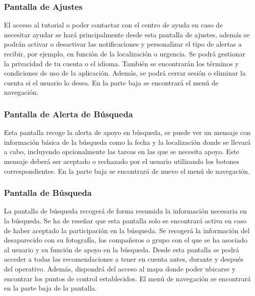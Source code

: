 
    \subsubsection{Pantalla de Ajustes}

    El acceso al tutorial o poder contactar con el centro de ayuda en caso de necesitar ayudar se hará principalmente desde esta pantalla de ajustes, además se podrán activar o desactivar las notificaciones y personalizar el tipo de alertas a recibir, por ejemplo, en función de la localización o urgencia. Se podrá gestionar la privacidad de tu cuenta o el idioma. También se encontrarán los términos y condiciones de uso de la aplicación. Además, se podrá cerrar sesión o eliminar la cuenta si el usuario lo desea. En la parte baja se encontrará el menú de navegación.



    \vspace{3cm}
    

    \subsubsection{Pantalla de Alerta de Búsqueda}
    Esta pantalla recoge la alerta de apoyo en búsqueda, se puede ver un mensaje con información básica de la búsqueda como la fecha y la localización donde se llevará a cabo, incluyendo opcionalmente las tareas en las que se necesita apoyo. Este mensaje deberá ser aceptado o rechazado por el usuario utilizando los botones correspondientes. En la parte baja se encontrará de nuevo el menú de navegación.
     


    \subsubsection{Pantalla de Búsqueda}
    La pantalla de búsqueda recogerá de forma resumida la información necesaria en la búsqueda. Se ha de reseñar que esta pantalla solo se encontrará activa en caso de haber aceptado la participación en la búsqueda. Se recogerá la información del desaparecido con su fotografía, los compañeros o grupo con el que se ha asociado al usuario y su función de apoyo en la búsqueda. Desde esta pantalla se podrá acceder a todas las recomendaciones a tener en cuenta antes, durante y después del operativo. Además, dispondrá del acceso al mapa donde poder ubicarse y encontrar los puntos de control establecidos. El menú de navegación se encontrará en la parte baja de la pantalla.
    

